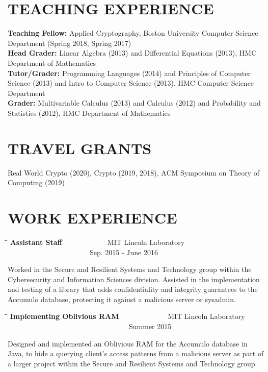 \documentclass{res}
\begin{document}
\begin{resume}
\section{TEACHING EXPERIENCE}
\vspace{0.1in}
\textbf{Teaching Fellow:} Applied Cryptography, Boston University Computer Science Department (Spring 2018, Spring 2017) \\
\textbf{Head Grader:}  Linear Algebra (2013) and 
Differential Equations (2013), HMC Department of Mathematics \\
\textbf{Tutor/Grader:} Programming Languages (2014) and Principles of Computer Science (2013) and
Intro to Computer Science (2013), HMC Computer Science Department \\
\textbf{Grader:}  Multivariable Calculus (2013) and Calculus (2012) and Probability and Statistics
(2012), HMC Department of Mathematics \\

\section{TRAVEL GRANTS}
\vspace{0.1in}
Real World Crypto (2020), Crypto (2019, 2018), ACM Symposium on Theory of Computing (2019) \\


\section{WORK EXPERIENCE}
\vspace{0in}
    \begin{tabbing}
   \hspace{3in}\=  \hspace{1.63in}\= \kill %
    {\bf Assistant Staff} \>~~~~~~~~~~~~MIT Lincoln Laboratory \>~~~~~~~~~~~~~~~~~~~~~~~Sep. 2015 - June 2016\\                       
   \end{tabbing}\vspace{-30pt}      %
    Worked in the Secure and Resilient Systems and Technology group within the Cybersecurity and Information Sciences division.  Assisted in the implementation and testing of a library that adds confidentiality and integrity guarantees to the Accumulo database, protecting it against a malicious server or sysadmin.

   \begin{tabbing}
   \hspace{3in}\=  \hspace{1.63in}\= \kill %
    {\bf Implementing Oblivious RAM} \>~~~~~~~~~~~~~MIT Lincoln Laboratory \>~~~~~~~~~~~~~~~~~~~~~~~~~~~~~~~~~~Summer 2015\\                       
   \end{tabbing}\vspace{-30pt}      %
    Designed and implemented an Oblivious RAM for the Accumulo database in Java, to hide a querying client's access patterns from a malicious server as part of a larger project within the Secure and Resilient Systems and Technology group.


\end{resume}
\end{document}
